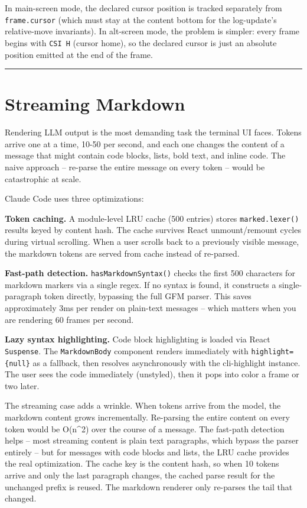 \documentclass[
  english,
  11pt,
  letterpaper,
]{book}
\begin{document}
In main-screen mode, the declared cursor position is tracked separately
from \texttt{frame.cursor} (which must stay at the content bottom for
the log-update's relative-move invariants). In alt-screen mode, the
problem is simpler: every frame begins with \texttt{CSI\ H} (cursor
home), so the declared cursor is just an absolute position emitted at
the end of the frame.

\begin{center}\rule{0.5\linewidth}{0.5pt}\end{center}

\section{Streaming Markdown}\label{streaming-markdown}

Rendering LLM output is the most demanding task the terminal UI faces.
Tokens arrive one at a time, 10-50 per second, and each one changes the
content of a message that might contain code blocks, lists, bold text,
and inline code. The naive approach -- re-parse the entire message on
every token -- would be catastrophic at scale.

Claude Code uses three optimizations:

\textbf{Token caching.} A module-level LRU cache (500 entries) stores
\texttt{marked.lexer()} results keyed by content hash. The cache
survives React unmount/remount cycles during virtual scrolling. When a
user scrolls back to a previously visible message, the markdown tokens
are served from cache instead of re-parsed.

\textbf{Fast-path detection.} \texttt{hasMarkdownSyntax()} checks the
first 500 characters for markdown markers via a single regex. If no
syntax is found, it constructs a single-paragraph token directly,
bypassing the full GFM parser. This saves approximately 3ms per render
on plain-text messages -- which matters when you are rendering 60 frames
per second.

\textbf{Lazy syntax highlighting.} Code block highlighting is loaded via
React \texttt{Suspense}. The \texttt{MarkdownBody} component renders
immediately with \texttt{highlight=\{null\}} as a fallback, then
resolves asynchronously with the cli-highlight instance. The user sees
the code immediately (unstyled), then it pops into color a frame or two
later.

The streaming case adds a wrinkle. When tokens arrive from the model,
the markdown content grows incrementally. Re-parsing the entire content
on every token would be O(n\^{}2) over the course of a message. The
fast-path detection helps -- most streaming content is plain text
paragraphs, which bypass the parser entirely -- but for messages with
code blocks and lists, the LRU cache provides the real optimization. The
cache key is the content hash, so when 10 tokens arrive and only the
last paragraph changes, the cached parse result for the unchanged prefix
is reused. The markdown renderer only re-parses the tail that changed.
\end{document}
